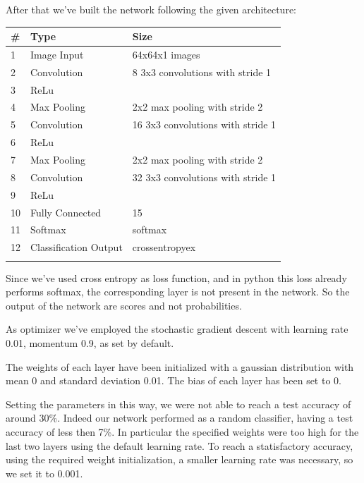 \documentclass[12pt, a4paper]{report}
\begin{document}
After that we've built the network following the given architecture:
	
\begin{table}[h!]
	\centering
	\begin{tabular}{lll}
		\# & Type & Size \\
		\midrule
		1 & Image Input & 64x64x1 images \\
		2 & Convolution & 8 3x3 convolutions with stride 1 \\
		3 & ReLu & \\
		4 & Max Pooling & 2x2 max pooling with stride 2 \\
		5 & Convolution & 16 3x3 convolutions with stride 1 \\
		6 & ReLu & \\
		7 & Max Pooling & 2x2 max pooling with stride 2 \\
		8 & Convolution & 32 3x3 convolutions with stride 1 \\
		9 & ReLu & \\
		10 & Fully Connected & 15 \\
		11 & Softmax & softmax \\
		12 & Classification Output & crossentropyex \\
		\bottomrule
		\label{tab:baseline}
	\end{tabular}
\end{table}
	
Since we've used cross entropy as loss function, and in python this loss already performs softmax, the corresponding layer is not present in the network. So the output of the network are scores and not probabilities.
	
As optimizer we've employed the stochastic gradient descent with learning rate 0.01, momentum 0.9, as set by default.
	
The weights of each layer have been initialized with a gaussian distribution with mean 0 and standard deviation 0.01. The bias of each layer has been set to 0.

Setting the parameters in this way, we were not able to reach a test accuracy of around 30\%. Indeed our network performed as a random classifier, having a test accuracy of less then 7\%. In particular the specified weights were too high for the last two layers using the default learning rate. To reach a statisfactory accuracy, using the required weight initialization, a smaller learning rate was necessary, so we set it to 0.001.
\end{document}
